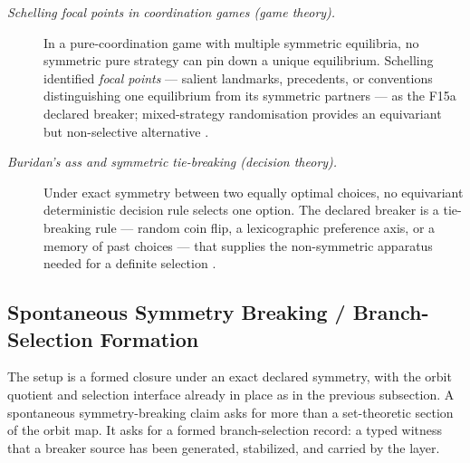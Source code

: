 \documentclass[11pt]{article}
\theoremstyle{definition}
\begin{document}
\begin{description}
\item[\emph{Schelling focal points in coordination games (game
theory).}]
In a pure-coordination game with multiple symmetric equilibria, no
symmetric pure strategy can pin down a unique equilibrium.  Schelling
identified \emph{focal points} --- salient landmarks, precedents,
or conventions distinguishing one equilibrium from its symmetric
partners --- as the F15a declared breaker; mixed-strategy
randomisation provides an equivariant but non-selective
alternative
\citep{Schelling1960StrategyConflict}.

\item[\emph{Buridan's ass and symmetric tie-breaking (decision
theory).}]
Under exact symmetry between two equally optimal choices, no
equivariant deterministic decision rule selects one option.  The
declared breaker is a tie-breaking rule --- random coin flip, a
lexicographic preference axis, or a memory of past choices --- that
supplies the non-symmetric apparatus needed for a definite
selection
\citep{Rescher1959ChoiceWithoutPreference}.
\end{description}

\subsection{Spontaneous Symmetry Breaking / Branch-Selection Formation}\label{sec:symmetry:spontaneous-ssb}

The setup is a formed closure under an exact declared symmetry, with
the orbit quotient and selection interface already in place as in the
previous subsection.  A spontaneous symmetry-breaking claim asks for
more than a set-theoretic section of the orbit map.  It asks for a
formed branch-selection record: a typed witness that a breaker source
has been generated, stabilized, and carried by the layer.
\end{document}
